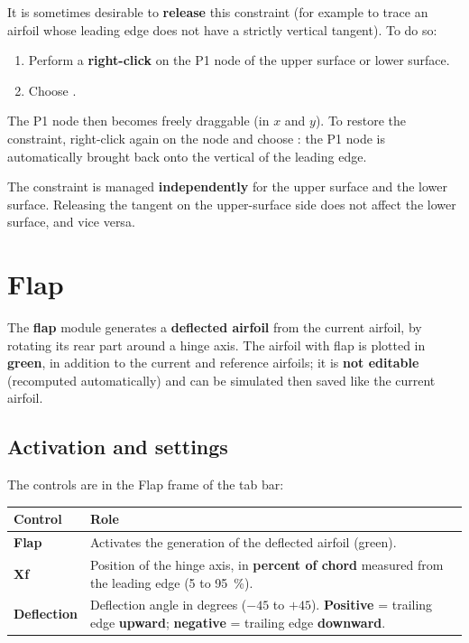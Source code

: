 It is sometimes desirable to \textbf{release} this constraint (for
example to trace an airfoil whose leading edge does not have a
strictly vertical tangent). To do so:

\begin{enumerate}
    \item Perform a \textbf{right-click} on the P1 node of the
        upper surface or lower surface.
    \item Choose .
\end{enumerate}

The P1 node then becomes freely draggable (in $x$ and $y$). To
restore the constraint, right-click again on the node and choose
: the P1
node is automatically brought back onto the vertical of the leading
edge.

\begin{noteinfo}
The constraint is managed \textbf{independently} for the upper
surface and the lower surface. Releasing the tangent on the
upper-surface side does not affect the lower surface, and vice
versa.
\end{noteinfo}

\section{Flap}
\label{sec:flap}

The \textbf{flap} module generates a \textbf{deflected airfoil} from
the current airfoil, by rotating its rear part around a hinge axis.
The airfoil with flap is plotted in \textbf{green}, in addition to
the current and reference airfoils; it is \textbf{not editable}
(recomputed automatically) and can be simulated then saved like the
current airfoil.


\subsection{Activation and settings}

The controls are in the \og Flap \fg{} frame of the 
tab bar:

\begin{tabularx}{\linewidth}{l X}
    \toprule
    \textbf{Control} & \textbf{Role} \\
    \midrule
    \textbf{Flap} & Activates the generation of the deflected airfoil (green). \\
    \textbf{Xf} & Position of the hinge axis, in \textbf{percent of
        chord} measured from the leading edge (5 to 95~\%). \\
    \textbf{Deflection} & Deflection angle in degrees ($-45$ to
        $+45$). \textbf{Positive} = trailing edge \textbf{upward};
        \textbf{negative} = trailing edge \textbf{downward}. \\
    \bottomrule
\end{tabularx}

